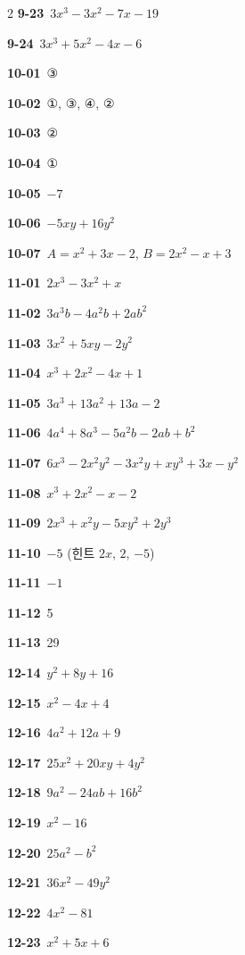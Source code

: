 \documentclass[10pt,a4paper]{article}
\begin{document}
\begin{multicols}{2}
\noindent\textbf{9-23}\ $3x^3-3x^2-7x-19$\par
\noindent\textbf{9-24}\ $3x^3+5x^2-4x-6$\par
\noindent\textbf{10-01}\ ③\par
\noindent\textbf{10-02}\ ①, ③, ④, ②\par
\noindent\textbf{10-03}\ ②\par
\noindent\textbf{10-04}\ ①\par
\noindent\textbf{10-05}\ $-7$\par
\noindent\textbf{10-06}\ $-5xy+16y^2$\par
\noindent\textbf{10-07}\ $A=x^2+3x-2$, $B=2x^2-x+3$\par
\noindent\textbf{11-01}\ $2x^3-3x^2+x$\par
\noindent\textbf{11-02}\ $3a^3b-4a^2b+2ab^2$\par
\noindent\textbf{11-03}\ $3x^2+5xy-2y^2$\par
\noindent\textbf{11-04}\ $x^3+2x^2-4x+1$\par
\noindent\textbf{11-05}\ $3a^3+13a^2+13a-2$\par
\noindent\textbf{11-06}\ $4a^4+8a^3-5a^2b-2ab+b^2$\par
\noindent\textbf{11-07}\ $6x^3-2x^2y^2-3x^2y+xy^3+3x-y^2$\par
\noindent\textbf{11-08}\ $x^3+2x^2-x-2$\par
\noindent\textbf{11-09}\ $2x^3+x^2y-5xy^2+2y^3$\par
\noindent\textbf{11-10}\ $-5$ (힌트 $2x$, $2$, $-5$)\par
\noindent\textbf{11-11}\ $-1$\par
\noindent\textbf{11-12}\ 5\par
\noindent\textbf{11-13}\ 29\par
\noindent\textbf{12-14}\ $y^2+8y+16$\par
\noindent\textbf{12-15}\ $x^2-4x+4$\par
\noindent\textbf{12-16}\ $4a^2+12a+9$\par
\noindent\textbf{12-17}\ $25x^2+20xy+4y^2$\par
\noindent\textbf{12-18}\ $9a^2-24ab+16b^2$\par
\noindent\textbf{12-19}\ $x^2-16$\par
\noindent\textbf{12-20}\ $25a^2-b^2$\par
\noindent\textbf{12-21}\ $36x^2-49y^2$\par
\noindent\textbf{12-22}\ $4x^2-81$\par
\noindent\textbf{12-23}\ $x^2+5x+6$\par

\end{multicols}
\end{document}
